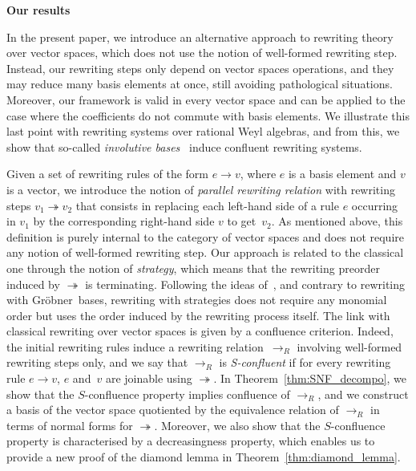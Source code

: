 \documentclass[11pt]{article}
\theoremstyle{definition}
\newcommand\G{Gröbner}
\newcommand\rewR{\to_R}
\newcommand\parRew{\twoheadrightarrow}
\begin{document}
\begin{center}
  {\large\bf Our results}
\end{center}

In the present paper, we introduce an alternative approach to rewriting theory
over vector spaces, which does not use the notion of well-formed rewriting
step. Instead, our rewriting steps only depend on vector spaces operations, and they
may reduce many basis elements at once, still avoiding pathological
situations. Moreover, our framework is valid in every vector space and can be
applied to the case where the coefficients do not commute with basis
elements. We illustrate this last point with rewriting systems over rational
Weyl algebras, and from this, we show that so-called {\em involutive
  bases}~\cite{MR1627129} induce confluent rewriting systems.  \medskip

Given a set of rewriting rules of the form $e\to v$, where $e$ is a basis element
and $v$ is a vector, we introduce the notion of {\em parallel rewriting
  relation} with rewriting steps $v_1\parRew v_2$ that consists in replacing
each left-hand side of a rule $e$ occurring in $v_1$ by the corresponding
right-hand side $v$ to get~$v_2$. As mentioned above, this definition is purely
internal to the category of vector spaces and does not require any notion of
well-formed rewriting step. Our approach is related to the classical one through
the notion of {\em strategy}, which means that the rewriting preorder induced by
$\parRew$ is terminating. Following the ideas of~\cite{GuiraudHoffbeckMalbos19},
and contrary to rewriting with \G\ bases, rewriting with strategies does not
require any monomial order but uses the order induced by the rewriting process
itself. The link with classical rewriting over vector spaces is given by a
confluence criterion. Indeed, the initial rewriting rules induce a rewriting
relation~$\rewR$ involving well-formed rewriting steps only, and we say that
$\rewR$ is {\em S-confluent} if for every rewriting rule $e\to v$, $e$ and~$v$ are
joinable using $\parRew$. In Theorem~\ref{thm:SNF_decompo}, we show
that the $S$-confluence property implies confluence of $\rewR$, and we construct
a basis of the vector space quotiented by the equivalence relation of $\rewR$ in
terms of normal forms for $\parRew$. Moreover, we also show that the
$S$-confluence property is characterised by a decreasingness property, which
enables us to provide a new proof of the diamond lemma in
Theorem~\ref{thm:diamond_lemma}.  \medskip
\end{document}
